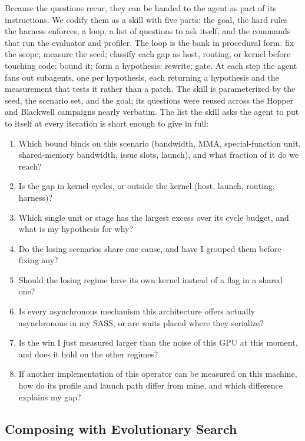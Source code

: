 Because the questions recur, they can be handed to the agent as part of its instructions. We codify
them as a skill with five parts: the goal, the hard rules the harness enforces, a loop, a list of
questions to ask itself, and the commands that run the evaluator and profiler. The loop is the bank
in procedural form: fix the scope; measure the seed; classify each gap as host, routing, or kernel
before touching code; bound it; form a hypothesis; rewrite; gate. At each step the agent fans out
subagents, one per hypothesis, each returning a hypothesis and the measurement that tests it rather
than a patch. The skill is parameterized by the seed, the scenario set, and the goal; its questions
were reused across the Hopper and Blackwell campaigns nearly verbatim. The list the skill asks the
agent to put to itself at every iteration is short enough to give in full:
\begin{enumerate}[nosep,leftmargin=*]
\item Which bound binds on this scenario (bandwidth, MMA, special-function unit, shared-memory bandwidth, issue slots, launch), and what fraction of it do we reach?
\item Is the gap in kernel cycles, or outside the kernel (host, launch, routing, harness)?
\item Which single unit or stage has the largest excess over its cycle budget, and what is my hypothesis for why?
\item Do the losing scenarios share one cause, and have I grouped them before fixing any?
\item Should the losing regime have its own kernel instead of a flag in a shared one?
\item Is every asynchronous mechanism this architecture offers actually asynchronous in my SASS, or are waits placed where they serialize?
\item Is the win I just measured larger than the noise of this GPU at this moment, and does it hold on the other regimes?
\item If another implementation of this operator can be measured on this machine, how do its profile and launch path differ from mine, and which difference explains my gap?
\end{enumerate}

\subsection{Composing with Evolutionary Search}
\label{kernelseek:sec:workflow-evo}

